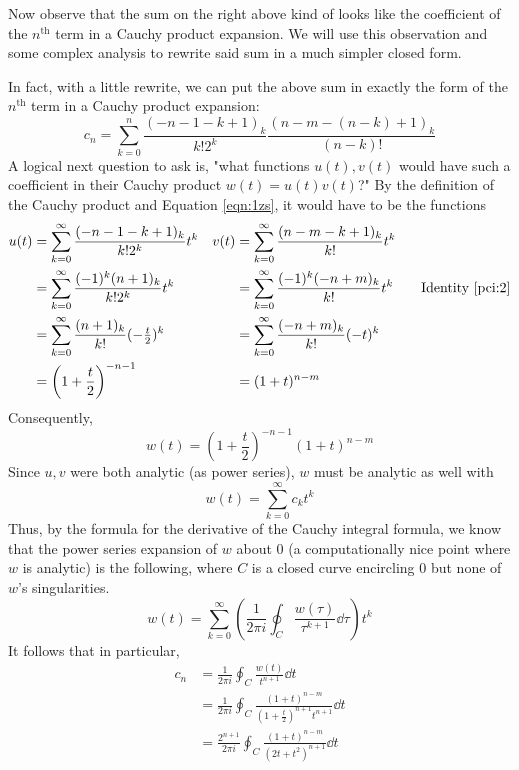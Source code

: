 \documentclass[titlepage]{article}
\numberwithin{equation}{section}
\begin{document}
Now observe that the sum on the right above kind of looks like the coefficient of the $n^\text{th}$ term in a Cauchy product expansion. We will use this observation and some complex analysis to rewrite said sum in a much simpler closed form.\par
In fact, with a little rewrite, we can put the above sum in exactly the form of the $n^\text{th}$ term in a Cauchy product expansion:
\begin{equation*}
    c_n = \sum_{k=0}^n\frac{(-n-1-k+1)_k}{k!2^k}\frac{(n-m-(n-k)+1)_k}{(n-k)!}
\end{equation*}
A logical next question to ask is, "what functions $u(t),v(t)$ would have such a coefficient in their Cauchy product $w(t)=u(t)v(t)$?" By the definition of the Cauchy product and Equation \ref{eqn:1zs}, it would have to be the functions
\begin{align*}
    u(t) &= \sum_{k=0}^\infty\frac{(-n-1-k+1)_k}{k!2^k}t^k&
        v(t) &= \sum_{k=0}^\infty\frac{(n-m-k+1)_k}{k!}t^k\\
    &= \sum_{k=0}^\infty\frac{(-1)^k(n+1)_k}{k!2^k}t^k&
        &= \sum_{k=0}^\infty\frac{(-1)^k(-n+m)_k}{k!}t^k\tag*{Identity \ref{pci:2}}\\
    &= \sum_{k=0}^\infty\frac{(n+1)_k}{k!}(-\tfrac{t}{2})^k&
        &= \sum_{k=0}^\infty\frac{(-n+m)_k}{k!}(-t)^k\\
    &= \left( 1+\frac{t}{2} \right)^{-n-1}&
        &= (1+t)^{n-m}
\end{align*}
Consequently,
\begin{equation*}
    w(t) = \left( 1+\frac{t}{2} \right)^{-n-1}(1+t)^{n-m}
\end{equation*}
Since $u,v$ were both analytic (as power series), $w$ must be analytic as well with
\begin{equation*}
    w(t) = \sum_{k=0}^\infty c_kt^k
\end{equation*}
Thus, by the formula for the derivative of the Cauchy integral formula, we know that the power series expansion of $w$ about 0 (a computationally nice point where $w$ is analytic) is the following, where $C$ is a closed curve encircling 0 but none of $w$'s singularities.
\begin{equation*}
    w(t) = \sum_{k=0}^\infty\left( \frac{1}{2\pi i}\oint_C\frac{w(\tau)}{\tau^{k+1}}\dd\tau \right)t^k
\end{equation*}
It follows that in particular,
\begin{align*}
    c_n &= \frac{1}{2\pi i}\oint_C\frac{w(t)}{t^{n+1}}\dd{t}\\
    &= \frac{1}{2\pi i}\oint_C\frac{(1+t)^{n-m}}{\left( 1+\tfrac{t}{2} \right)^{n+1}t^{n+1}}\dd{t}\\
    &= \frac{2^{n+1}}{2\pi i}\oint_C\frac{(1+t)^{n-m}}{(2t+t^2)^{n+1}}\dd{t}
\end{align*}
\end{document}
